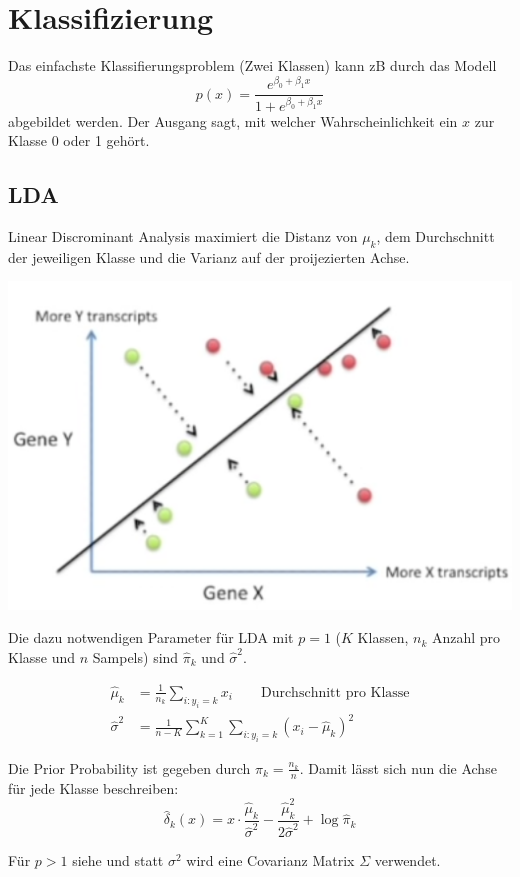 \section{Klassifizierung}
 Das einfachste Klassifierungsproblem (Zwei Klassen) kann zB durch das Modell
\[
p(x) = \frac{e^{\beta_0 + \beta_1x}}{1+ e^{\beta_0 + \beta_1x}}
\]
abgebildet werden. Der Ausgang sagt, mit welcher Wahrscheinlichkeit ein $x$ zur Klasse 0 oder 1 gehört.

\subsection{LDA}
Linear Discrominant Analysis maximiert die Distanz von $\mu_k$, dem Durchschnitt der jeweiligen Klasse und die Varianz auf der proijezierten Achse.
\begin{center}
	\includegraphics[width=0.8\columnwidth]{./Images/lda}
\end{center}

Die dazu notwendigen Parameter für LDA mit $p=1$ ($K$ Klassen, $n_k$ Anzahl pro Klasse und $n$ Sampels) sind $\hat{\pi}_k$ und $\hat{\sigma}^2$.

\begin{align*}
	\hat{\mu}_k &= \frac{1}{n_k}\sum_{i: y_i=k} x_i \qquad \text{Durchschnitt pro Klasse} \\
	\hat\sigma^2 &= \frac{1}{n-K}\sum_{k=1}^{K}\sum_{i: y_i=k}(x_i-\hat\mu_k)^2
\end{align*}

Die Prior Probability ist gegeben durch $\hat{\pi}_k = \frac{n_k}{n}$. Damit lässt sich nun die Achse für jede Klasse beschreiben:
\[
\hat\delta_k(x) = x \cdot \frac{\hat\mu_k}{\hat\sigma^2}-\frac{\hat\mu_k^2}{2\hat\sigma^2} + \log{\hat\pi_k}
\]

Für $p\gt1$ siehe  und statt $\sigma^2$ wird eine Covarianz Matrix $\Sigma$ verwendet.